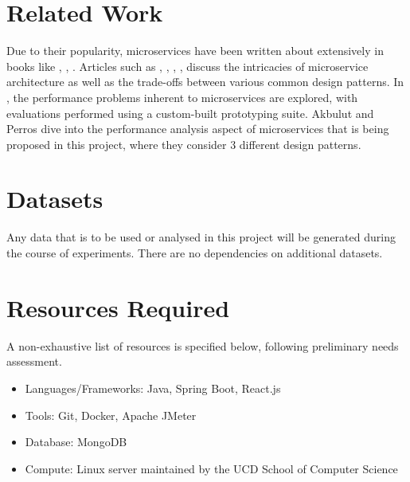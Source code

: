 \section{Related Work}
Due to their popularity, microservices have been written about extensively in books like \cite{richardson18}, 
\cite{kleppmann17}, \cite{newman14}. Articles such as \cite{md19}, \cite{md20}, \cite{sahiti20}, \cite{udantha19}, 
\cite{lewis14} discuss the intricacies of microservice architecture as well as the trade-offs between various 
common design patterns. In \cite{cully20}, the performance problems inherent to microservices are explored, with 
evaluations performed using a custom-built prototyping suite. Akbulut and Perros \cite{akbulut19} dive into the 
performance analysis aspect of microservices that is being proposed in this project, where they consider 3 different
 design patterns.

\section{Datasets}
Any data that is to be used or analysed in this project will be generated during the course of experiments. There 
are no dependencies on additional datasets.

\section{Resources Required}

A non-exhaustive list of resources is specified below, following preliminary needs assessment.

\begin{itemize}
	\item Languages/Frameworks: Java, Spring Boot, React.js
	\item Tools: Git, Docker, Apache JMeter
	\item Database: MongoDB
	\item Compute: Linux server maintained by the UCD School of Computer Science
\end{itemize}

